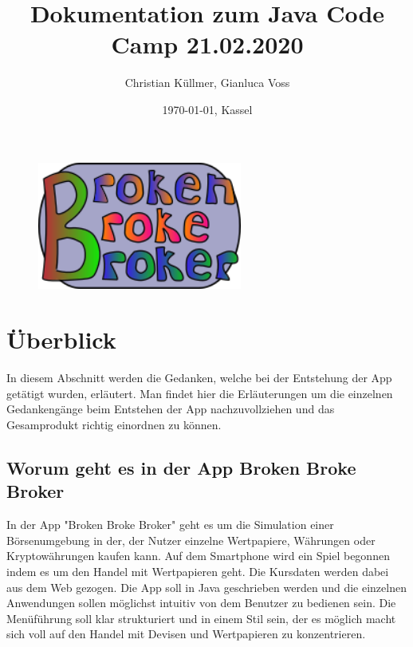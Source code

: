 \documentclass[10pt]{scrartcl}
\begin{document}
\title{Dokumentation zum Java Code Camp 21.02.2020}

\author{Christian Küllmer, Gianluca Voss}
\date{\today{}, Kassel}
\maketitle
\begin{figure}[H]
	\centering
	\includegraphics[width=0.6\textwidth]{Bilder/Titelblatt/big_logo.png}
\end{figure}
\newpage
\renewcommand{\contentsname}{Inhaltsverzeichnis}
\tableofcontents
\newpage

\section{Überblick}

In diesem Abschnitt werden die Gedanken, welche bei der Entstehung der App getätigt wurden, erläutert. Man findet hier die Erläuterungen um die einzelnen Gedankengänge beim Entstehen der App nachzuvollziehen und das Gesamprodukt richtig einordnen zu können.

\subsection{Worum geht es in der App Broken Broke Broker}
In der App "Broken Broke Broker" geht es um die Simulation einer Börsenumgebung in der, der Nutzer einzelne Wertpapiere, Währungen  oder Kryptowährungen kaufen kann. Auf dem Smartphone wird ein Spiel begonnen indem es um den Handel mit Wertpapieren geht. Die Kursdaten werden dabei aus dem Web gezogen. Die App soll in Java geschrieben werden und die einzelnen Anwendungen sollen möglichst intuitiv von dem Benutzer zu bedienen sein. Die Menüführung soll klar strukturiert und in einem Stil sein, der es möglich macht sich voll auf den Handel mit Devisen und Wertpapieren zu konzentrieren.
\end{document}
